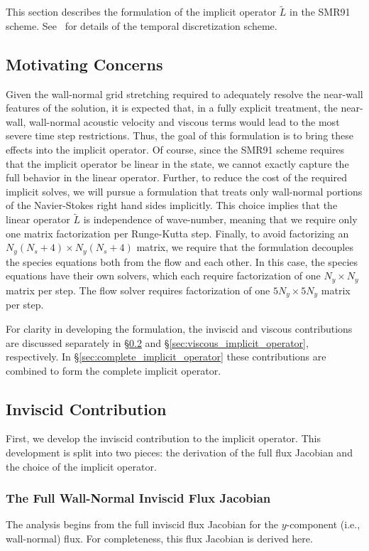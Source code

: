 This section describes the formulation of the implicit operator
$\tilde{L}$ in the SMR91 scheme.  See~\cite{Ulerich_SZPerfect} for
details of the temporal discretization scheme.

\subsection{Motivating Concerns}
Given the wall-normal grid stretching required to adequately resolve
the near-wall features of the solution, it is expected that, in a
fully explicit treatment, the near-wall, wall-normal acoustic velocity
and viscous terms would lead to the most severe time step
restrictions.  Thus, the goal of this formulation is to bring these
effects into the implicit operator.  Of course, since the SMR91 scheme
requires that the implicit operator be linear in the state, we cannot
exactly capture the full behavior in the linear operator.  Further, to
reduce the cost of the required implicit solves, we will pursue a
formulation that treats only wall-normal portions of the Navier-Stokes
right hand sides implicitly.  This choice implies that the linear
operator $\tilde{L}$ is independence of wave-number, meaning that we
require only one matrix factorization per Runge-Kutta step.
Finally, to avoid factorizing an $N_y (N_s + 4) \times N_y (N_s + 4)$
matrix, we require that the formulation decouples the species
equations both from the flow and each other.  In this case, the
species equations have their own solvers, which each require
factorization of one $N_y \times N_y$ matrix per step.  The flow
solver requires factorization of one $5 N_y \times 5 N_y$ matrix per
step.

For clarity in developing the formulation, the inviscid and viscous
contributions are discussed separately in
\S\ref{sec:inviscid_implicit_operator} and
\S\ref{sec:viscous_implicit_operator}, respectively.  In
\S\ref{sec:complete_implicit_operator} these contributions are combined
to form the complete implicit operator.

\subsection{Inviscid Contribution}
\label{sec:inviscid_implicit_operator}
First, we develop the inviscid contribution to the implicit operator.
This development is split into two pieces: the derivation of the full
flux Jacobian and the choice of the implicit operator.

\subsubsection{The Full Wall-Normal Inviscid Flux Jacobian}
The analysis begins from the full inviscid flux Jacobian for the
$y$-component (i.e., wall-normal) flux.  For completeness, this flux
Jacobian is derived here.

